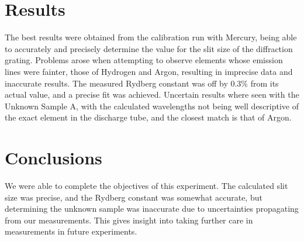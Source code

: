 \documentclass[a4paper, twocolumn]{article}
\begin{document}
\section{Results}
The best results were obtained from the calibration run with Mercury, being able to accurately and precisely determine the value for the slit size of the diffraction grating.
Problems arose when attempting to observe elements whose emission lines were fainter, those of Hydrogen and Argon, resulting in imprecise data and inaccurate results.
The measured Rydberg constant was off by 0.3\% from its actual value, and a precise fit was achieved. Uncertain results where seen with the
Unknown Sample A, with the calculated wavelengths not being well descriptive of the exact element in the discharge tube, and the closest match is that of Argon.

\section{Conclusions}
We were able to complete the objectives of this experiment. The calculated slit size was precise, and the Rydberg constant was somewhat accurate,
but determining the unknown sample was inaccurate due to uncertainties propagating from our measurements. 
This gives insight into taking further care in measurements in future experiments.
\end{document}
